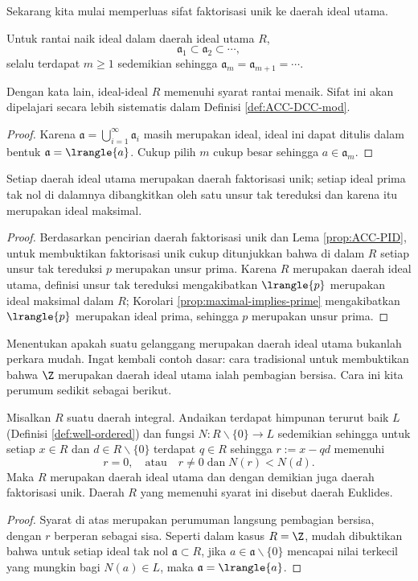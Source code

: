 Sekarang kita mulai memperluas sifat faktorisasi unik ke daerah ideal utama.
\begin{lemma}\label{prop:ACC-PID}
	Untuk rantai naik ideal dalam daerah ideal utama $R$,
	\[ \mathfrak{a}_1 \subset \mathfrak{a}_2 \subset \cdots, \]
	selalu terdapat $m \geq 1$ sedemikian sehingga $\mathfrak{a}_m = \mathfrak{a}_{m+1} = \cdots$.
\end{lemma}
Dengan kata lain, ideal-ideal $R$ memenuhi syarat rantai menaik. Sifat ini akan dipelajari secara lebih sistematis dalam Definisi \ref{def:ACC-DCC-mod}.
\begin{proof}
	Karena $\mathfrak{a} = \bigcup_{i=1}^\infty \mathfrak{a}_i$ masih merupakan ideal, ideal ini dapat ditulis dalam bentuk $\mathfrak{a}= \lrangle{a}$. Cukup pilih $m$ cukup besar sehingga $a \in \mathfrak{a}_m$.
\end{proof}

\begin{theorem}\label{prop:PID-UFD}
	Setiap daerah ideal utama merupakan daerah faktorisasi unik; setiap ideal prima tak nol di dalamnya dibangkitkan oleh satu unsur tak tereduksi dan karena itu merupakan ideal maksimal.
\end{theorem}
\begin{proof}
	Berdasarkan pencirian daerah faktorisasi unik dan Lema \ref{prop:ACC-PID}, untuk membuktikan faktorisasi unik cukup ditunjukkan bahwa di dalam $R$ setiap unsur tak tereduksi $p$ merupakan unsur prima. Karena $R$ merupakan daerah ideal utama, definisi unsur tak tereduksi mengakibatkan $\lrangle{p}$ merupakan ideal maksimal dalam $R$; Korolari \ref{prop:maximal-implies-prime} mengakibatkan $\lrangle{p}$ merupakan ideal prima, sehingga $p$ merupakan unsur prima.
\end{proof}

Menentukan apakah suatu gelanggang merupakan daerah ideal utama bukanlah perkara mudah. Ingat kembali contoh dasar: cara tradisional untuk membuktikan bahwa $\Z$ merupakan daerah ideal utama ialah pembagian bersisa. Cara ini kita perumum sedikit sebagai berikut.
\begin{lemma}\label{prop:Euclidean-ring}
	Misalkan $R$ suatu daerah integral. Andaikan terdapat himpunan terurut baik $L$ (Definisi \ref{def:well-ordered}) dan fungsi $N: R \smallsetminus \{0\} \to L$ sedemikian sehingga untuk setiap $x \in R$ dan $d \in R \smallsetminus \{0\}$ terdapat $q \in R$ sehingga $r := x-qd$ memenuhi
	\[ r=0,  \quad \text{atau}\quad r \neq 0 \;\text{dan}\; N(r) < N(d). \]
	Maka $R$ merupakan daerah ideal utama dan dengan demikian juga daerah faktorisasi unik. Daerah $R$ yang memenuhi syarat ini disebut daerah Euklides.
\end{lemma}
\begin{proof}
	Syarat di atas merupakan perumuman langsung pembagian bersisa, dengan $r$ berperan sebagai sisa. Seperti dalam kasus $R=\Z$, mudah dibuktikan bahwa untuk setiap ideal tak nol $\mathfrak{a} \subset R$, jika $a \in \mathfrak{a} \smallsetminus \{0\}$ mencapai nilai terkecil yang mungkin bagi $N(a) \in L$, maka $\mathfrak{a} = \lrangle{a}$.
\end{proof}

